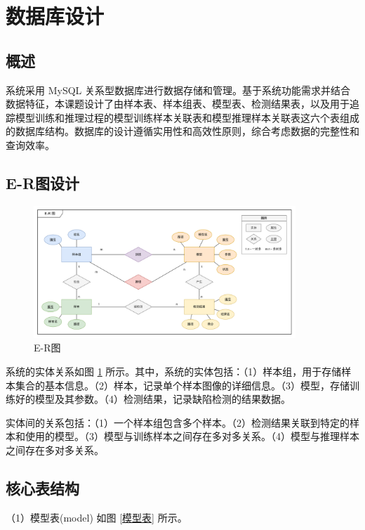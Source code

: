 \documentclass[
  ]{njuthesis}
\begin{document}
\section{数据库设计}

\subsection{概述}

系统采用 MySQL 关系型数据库进行数据存储和管理。基于系统功能需求并结合数据特征，本课题设计了由样本表、样本组表、模型表、检测结果表，以及用于追踪模型训练和推理过程的模型训练样本关联表和模型推理样本关联表这六个表组成的数据库结构。数据库的设计遵循实用性和高效性原则，综合考虑数据的完整性和查询效率。

\subsection{E-R图设计}

\begin{figure}[H]
    \centering
    \includegraphics[width=0.88\textwidth]{images/E-R图.png}
    \caption{E-R图}
    \label{E-R图}
\end{figure}

系统的实体关系如图 \ref{E-R图} 所示。其中，系统的实体包括：（1）样本组，用于存储样本集合的基本信息。（2）样本，记录单个样本图像的详细信息。（3）模型，存储训练好的模型及其参数。（4）检测结果，记录缺陷检测的结果数据。

实体间的关系包括：（1）一个样本组包含多个样本。（2）检测结果关联到特定的样本和使用的模型。（3）模型与训练样本之间存在多对多关系。（4）模型与推理样本之间存在多对多关系。

\subsection{核心表结构}

（1）模型表(model) 如图 \ref{模型表} 所示。
\end{document}
